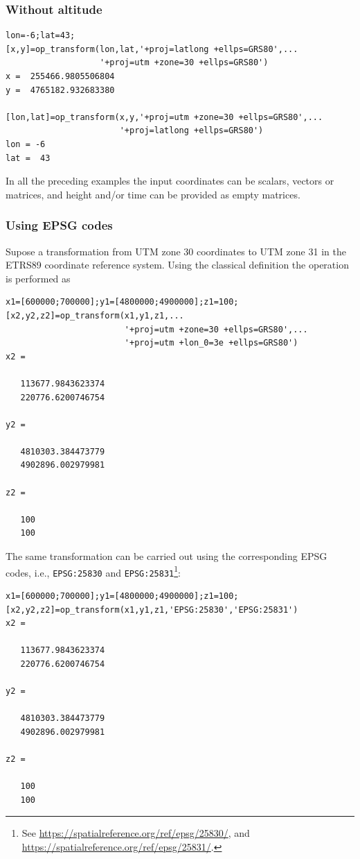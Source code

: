 \documentclass[10pt,a4paper]{article}
\begin{document}
\subsubsection{Without altitude}

\begin{verbatim}
lon=-6;lat=43;
[x,y]=op_transform(lon,lat,'+proj=latlong +ellps=GRS80',...
                   '+proj=utm +zone=30 +ellps=GRS80')
x =  255466.9805506804
y =  4765182.932683380

[lon,lat]=op_transform(x,y,'+proj=utm +zone=30 +ellps=GRS80',...
                       '+proj=latlong +ellps=GRS80')
lon = -6
lat =  43
\end{verbatim}

In all the preceding examples the input coordinates can be scalars, vectors or
matrices, and height and/or time can be provided as empty matrices.

\subsubsection{Using EPSG codes}

Supose a transformation from UTM zone 30 coordinates to UTM zone 31 in the
ETRS89 coordinate reference system. Using the classical definition the operation
is performed as

\begin{verbatim}
x1=[600000;700000];y1=[4800000;4900000];z1=100;
[x2,y2,z2]=op_transform(x1,y1,z1,...
                        '+proj=utm +zone=30 +ellps=GRS80',...
                        '+proj=utm +lon_0=3e +ellps=GRS80')
x2 =

   113677.9843623374
   220776.6200746754

y2 =

   4810303.384473779
   4902896.002979981

z2 =

   100
   100
\end{verbatim}

The same transformation can be carried out using the corresponding EPSG
codes, i.e., \texttt{EPSG:25830} and
\texttt{EPSG:25831}\footnote{See
\url{https://spatialreference.org/ref/epsg/25830/},
and \url{https://spatialreference.org/ref/epsg/25831/}.}:

\begin{verbatim}
x1=[600000;700000];y1=[4800000;4900000];z1=100;
[x2,y2,z2]=op_transform(x1,y1,z1,'EPSG:25830','EPSG:25831')
x2 =

   113677.9843623374
   220776.6200746754

y2 =

   4810303.384473779
   4902896.002979981

z2 =

   100
   100
\end{verbatim}
\end{document}
